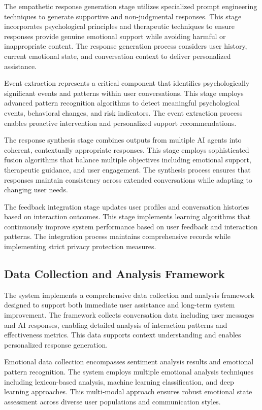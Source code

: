 The empathetic response generation stage utilizes specialized prompt engineering techniques to generate supportive and non-judgmental responses. This stage incorporates psychological principles and therapeutic techniques to ensure responses provide genuine emotional support while avoiding harmful or inappropriate content. The response generation process considers user history, current emotional state, and conversation context to deliver personalized assistance.

Event extraction represents a critical component that identifies psychologically significant events and patterns within user conversations. This stage employs advanced pattern recognition algorithms to detect meaningful psychological events, behavioral changes, and risk indicators. The event extraction process enables proactive intervention and personalized support recommendations.

The response synthesis stage combines outputs from multiple AI agents into coherent, contextually appropriate responses. This stage employs sophisticated fusion algorithms that balance multiple objectives including emotional support, therapeutic guidance, and user engagement. The synthesis process ensures that responses maintain consistency across extended conversations while adapting to changing user needs.

The feedback integration stage updates user profiles and conversation histories based on interaction outcomes. This stage implements learning algorithms that continuously improve system performance based on user feedback and interaction patterns. The integration process maintains comprehensive records while implementing strict privacy protection measures.

\subsection{Data Collection and Analysis Framework}

The system implements a comprehensive data collection and analysis framework designed to support both immediate user assistance and long-term system improvement. The framework collects conversation data including user messages and AI responses, enabling detailed analysis of interaction patterns and effectiveness metrics. This data supports context understanding and enables personalized response generation.

Emotional data collection encompasses sentiment analysis results and emotional pattern recognition. The system employs multiple emotional analysis techniques including lexicon-based analysis, machine learning classification, and deep learning approaches. This multi-modal approach ensures robust emotional state assessment across diverse user populations and communication styles.

